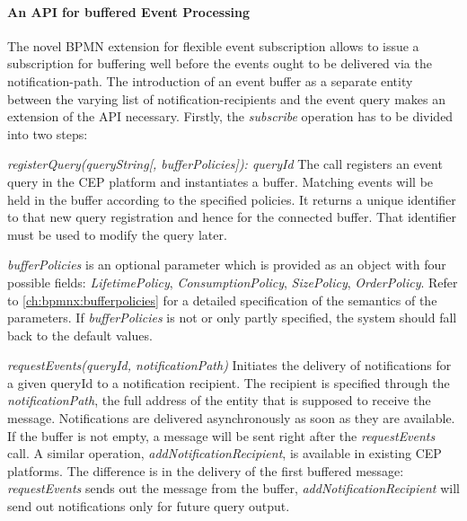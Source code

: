 
\paragraph{An API for buffered Event Processing}
The novel BPMN extension for flexible event subscription allows to issue a subscription for buffering well before the events ought to be delivered via the notification-path. The introduction of an event buffer as a separate entity between the varying list of notification-recipients and the event query makes an extension of the API necessary.
Firstly, the \textit{subscribe} operation has to be divided into two steps:

\begin{aenumerate}
	\item \textit{registerQuery(queryString[, bufferPolicies]): queryId}\newline
	The call registers an event query in the CEP platform and instantiates a buffer. Matching events will be held in the buffer according to the specified  policies. It returns a unique identifier to that new query registration and hence for the connected buffer. That identifier must be used to modify the query later.
	
	\textit{bufferPolicies} is an optional parameter which is provided as an object with four possible fields: \textit{LifetimePolicy}, \textit{ConsumptionPolicy}, \textit{SizePolicy}, \textit{OrderPolicy}. Refer to \autoref{ch:bpmnx:bufferpolicies} for a detailed specification of the semantics of the parameters. If \textit{bufferPolicies} is not or only partly specified, the system should fall back to the default values.
	
	\item \textit{requestEvents(queryId, notificationPath)}\newline
	Initiates the delivery of notifications for a given queryId to a notification recipient.
	The recipient is specified through the \textit{notificationPath}, the full address of the entity that is supposed to receive the message.
	Notifications are delivered asynchronously as soon as they are available. If the buffer is not empty, a message will be sent right after the \textit{requestEvents} call.
	A similar operation, \textit{addNotificationRecipient}, is available in existing CEP platforms. The difference is in the delivery of the first buffered message: \textit{requestEvents} sends out the message from the buffer, \textit{addNotificationRecipient} will send out notifications only for future query output.
\end{aenumerate}\label{def:apiextension-subscribe}

